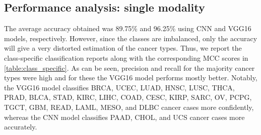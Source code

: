 \subsection{Performance analysis: single modality}
The average accuracy obtained was 89.75\% and 96.25\% using CNN and VGG16 models, respectively. However, since the classes are imbalanced, only the accuracy will give a very distorted estimation of the cancer types. Thus, we report the class-specific classification reports along with the corresponding MCC scores in \cref{table:class_specific}. As can be seen, precision and recall for the majority cancer types were high and for these the VGG16 model performs mostly better. Notably, the VGG16 model classifies BRCA, UCEC, LUAD, HNSC, LUSC, THCA, PRAD, BLCA, STAD, KIRC, LIHC, COAD, CESC, KIRP, SARC, OV, PCPG, TGCT, GBM, READ, LAML, MESO, and DLBC cancer cases more confidently, whereas the CNN model classifies PAAD, CHOL, and UCS cancer cases more accurately. 


